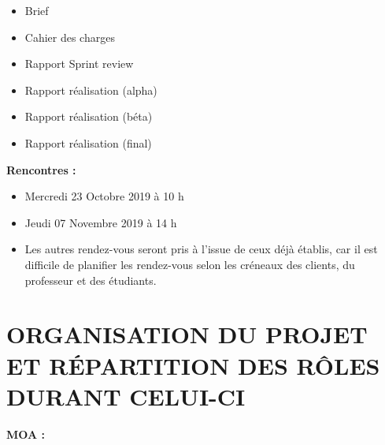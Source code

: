 \documentclass[12pt,titlepage]{report}
\begin{document}
\begin{itemize}
	\item Brief\par

	\item Cahier des charges\par

	\item Rapport Sprint review\par

	\item Rapport réalisation (alpha)\par

	\item Rapport réalisation (béta)\par

	\item Rapport réalisation (final)\\
 \tab 
\end{itemize}\par

\begin{justify}
\textbf{Rencontres :}
\end{justify}\par

\begin{itemize}
	\item Mercredi 23 Octobre 2019 à 10 h \tab \tab \par

	\item Jeudi 07 Novembre 2019 à 14 h\par

	\item Les autres rendez-vous seront pris à l’issue de ceux déjà établis, car il est difficile de planifier les rendez-vous selon les créneaux des clients, du professeur et des étudiants.
\end{itemize}\par


\vspace{\baselineskip}
\section{ORGANISATION DU PROJET ET RÉPARTITION DES RÔLES DURANT CELUI-CI}
\begin{justify}
\textbf{MOA :}
\end{justify}\par
\end{document}
